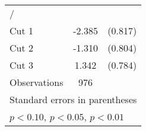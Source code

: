 \begin{table}[htbp]
\begin{tabular}{l*{1}{cc}}
\hline
/                   &                     &            \\
Cut 1               &      -2.385\sym{***}&     (0.817)\\
Cut 2               &      -1.310         &     (0.804)\\
Cut 3               &       1.342\sym{*}  &     (0.784)\\
\hline
Observations        &         976         &            \\
\hline\hline
\multicolumn{3}{l}{\footnotesize Standard errors in parentheses}\\
\multicolumn{3}{l}{\footnotesize \sym{*} \(p<0.10\), \sym{**} \(p<0.05\), \sym{***} \(p<0.01\)}\\
\end{tabular}
\end{table}
